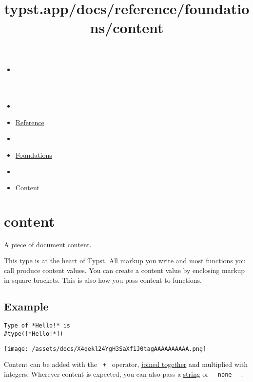 \title{typst.app/docs/reference/foundations/content}

\begin{itemize}
\tightlist
\item
  \href{/docs}{}
\item
  
\item
  \href{/docs/reference/}{Reference}
\item
  
\item
  \href{/docs/reference/foundations/}{Foundations}
\item
  
\item
  \href{/docs/reference/foundations/content/}{Content}
\end{itemize}

\section{\texorpdfstring{{ content }}{ content }}\label{summary}

A piece of document content.

This type is at the heart of Typst. All markup you write and most
\href{/docs/reference/foundations/function/}{functions} you call produce
content values. You can create a content value by enclosing markup in
square brackets. This is also how you pass content to functions.

\subsection{Example}\label{example}

\begin{verbatim}
Type of *Hello!* is
#type([*Hello!*])
\end{verbatim}

\texttt{[image: /assets/docs/X4qekl24YgH3SaXf1J0tagAAAAAAAAAA.png]}

Content can be added with the \texttt{\ +\ } operator,
\href{/docs/reference/scripting/\#blocks}{joined together} and
multiplied with integers. Wherever content is expected, you can also
pass a \href{/docs/reference/foundations/str/}{string} or
\texttt{\ }{\texttt{\ none\ }}\texttt{\ } .

